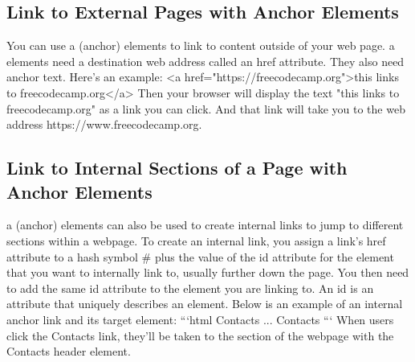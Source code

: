 \documentclass{article}%
\begin{document}
%
\subsection{Link to External Pages with Anchor Elements}%
\label{subsec:LinktoExternalPageswithAnchorElements}%
You can use a (anchor) elements to link to content outside of your web page.\newline%
a elements need a destination web address called an href attribute. They also need anchor text. Here's an example:\newline%
<a href="https://freecodecamp.org">this links to freecodecamp.org</a>\newline%
Then your browser will display the text "this links to freecodecamp.org" as a link you can click. And that link will take you to the web address https://www.freecodecamp.org.\newline%

%
\subsection{Link to Internal Sections of a Page with Anchor Elements}%
\label{subsec:LinktoInternalSectionsofaPagewithAnchorElements}%
a (anchor) elements can also be used to create internal links to jump to different sections within a webpage.\newline%
To create an internal link, you assign a link's href attribute to a hash symbol \# plus the value of the id attribute for the element that you want to internally link to, usually further down the page. You then need to add the same id attribute to the element you are linking to. An id is an attribute that uniquely describes an element.\newline%
Below is an example of an internal anchor link and its target element:\newline%
```html\newline%
Contacts\newline%
...\newline%
Contacts\newline%
```\newline%
When users click the Contacts link, they'll be taken to the section of the webpage with the Contacts header element.\newline%

%
\end{document}
